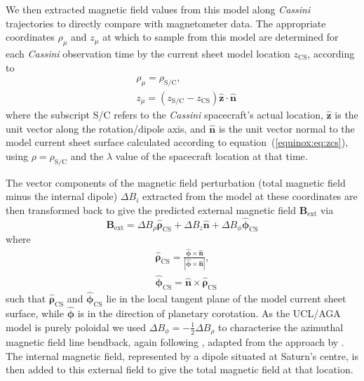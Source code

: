 We then extracted magnetic field values from this model along \textit{Cassini} trajectories to directly compare with magnetometer data. The appropriate coordinates $\rho_\mu$ and $z_\mu$ at which to sample from this model are determined for each \textit{Cassini} observation time by the current sheet model location $z_\mathrm{CS}$, according to
\begin{align}\label{equinox:eq:coordinatetransform}
& \rho_\mu = \rho_\mathrm{S/C},\nonumber\\
& z_\mu = (z_\mathrm{S/C} - z_\mathrm{CS})\hat{\boldsymbol{z}}\cdot\hat{\boldsymbol{n}}
\end{align}
where the subscript S/C refers to the \textit{Cassini} spacecraft's actual location, $\hat{\boldsymbol{z}}$ is the unit vector along the rotation/dipole axis, and $\hat{\boldsymbol{n}}$ is the unit vector normal to the model current sheet surface calculated according to equation~(\ref{equinox:eq:zcs}), using $\rho = \rho_\mathrm{S/C}$ and the $\lambda$ value of the spacecraft location at that time.

The vector components of the magnetic field perturbation (total magnetic field minus the internal dipole) $\Delta B_i$ extracted from the model at these coordinates are then transformed back to give the predicted external magnetic field $\boldsymbol{B_\mathrm{ext}}$ via
\begin{equation}\label{equinox:eq:Bext}
\boldsymbol{B_\mathrm{ext}} = \Delta B_\rho \hat{\boldsymbol{\rho}}_\mathrm{CS} + \Delta B_z \hat{\boldsymbol{n}} + \Delta B_\phi \hat{\boldsymbol{\phi}}_\mathrm{CS}
\end{equation}
where
\begin{align}\label{equinox:eq:vectortransform}
& \hat{\boldsymbol{\rho}}_\mathrm{CS} = \frac{\hat{\boldsymbol{\phi}} \times \hat{\boldsymbol{n}}}{| \hat{\boldsymbol{\phi}} \times \hat{\boldsymbol{n}}|}, \nonumber\\
& \hat{\boldsymbol{\phi}}_\mathrm{CS} = \hat{\boldsymbol{n}} \times \hat{\boldsymbol{\rho}}_\mathrm{CS}
\end{align}
such that $\hat{\boldsymbol{\rho}}_\mathrm{CS}$ and $\hat{\boldsymbol{\phi}}_\mathrm{CS}$ lie in the local tangent plane of the model current sheet surface, while $\hat{\boldsymbol{\phi}}$ is in the direction of planetary corotation. As the UCL/AGA model is purely poloidal we used $\Delta B_\phi = -\frac{1}{2} \Delta B_\rho$ to characterise the azimuthal magnetic field line bendback, again following \citet{achilleos2014}, adapted from the approach by \citet{arridge2011}. The internal magnetic field, represented by a dipole situated at Saturn's centre, is then added to this external field to give the total magnetic field at that location. 

